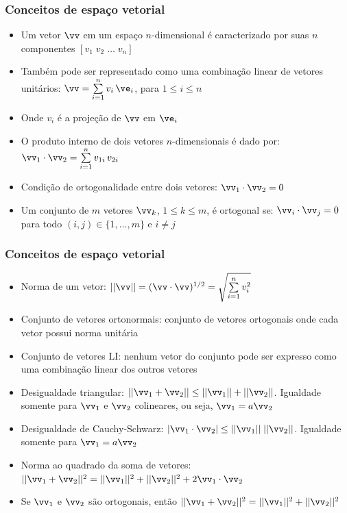 \begin{frame}
	\frametitle{Conceitos de espaço vetorial}

	\begin{itemize}
	 \item Um vetor $\vv$ em um espaço $n$-dimensional é caracterizado por suas $n$ componentes $[v_1 \; v_2 \; \ldots \; v_n]$
	  \item Também pode ser representado como uma combinação linear de vetores unitários: $\vv = \sum\limits_{i=1}^n v_i \, \ve_i$, para $1 \leq i \leq n$
	  \item Onde $v_i$ é a projeção de $\vv$ em $\ve_i$
	  \item O produto interno de dois vetores $n$-dimensionais é dado por: $\vv_1 \cdot \vv_2 = \sum\limits_{i=1}^n v_{1i} \, v_{2i}$
	  \item Condição de ortogonalidade entre dois vetores: $\vv_1 \cdot \vv_2 = 0$
	  \item Um conjunto de $m$ vetores $\vv_k$, $1\leq k \leq m$, é ortogonal se: $\vv_i \cdot \vv_j = 0$ para todo $(i,j) \in \{1, \ldots, m\}$ e $i \neq j$
	\end{itemize}

\end{frame}


\begin{frame}
	\frametitle{Conceitos de espaço vetorial}

	\begin{itemize}
	 \item Norma de um vetor: $||\vv|| = (\vv \cdot \vv)^{1/2} = \sqrt{\sum\limits_{i=1}^n v_i^2}$
	  \item Conjunto de vetores ortonormais: conjunto de vetores ortogonais onde cada vetor possui norma unitária
	  \item Conjunto de vetores LI: nenhum vetor do conjunto pode ser expresso como uma combinação linear dos outros vetores
	  \item Desigualdade triangular: $||\vv_1 + \vv_2|| \leq ||\vv_1|| + ||\vv_2||$. Igualdade somente para $\vv_1$ e $\vv_2$ colineares, ou seja, $\vv_1 = a\vv_2$
	  \item Desigualdade de Cauchy-Schwarz: $|\vv_1 \cdot \vv_2| \leq ||\vv_1 || \; ||\vv_2 ||$. Igualdade somente para $\vv_1 = a\vv_2$
	  \item Norma ao quadrado da soma de vetores: $||\vv_1 + \vv_2||^2 = ||\vv_1||^2 + ||\vv_2||^2 + 2 \vv_1 \cdot \vv_2$
	  \item Se $\vv_1$ e $\vv_2$ são ortogonais, então $||\vv_1 + \vv_2||^2 = ||\vv_1||^2 + ||\vv_2||^2$
	\end{itemize}

\end{frame}

